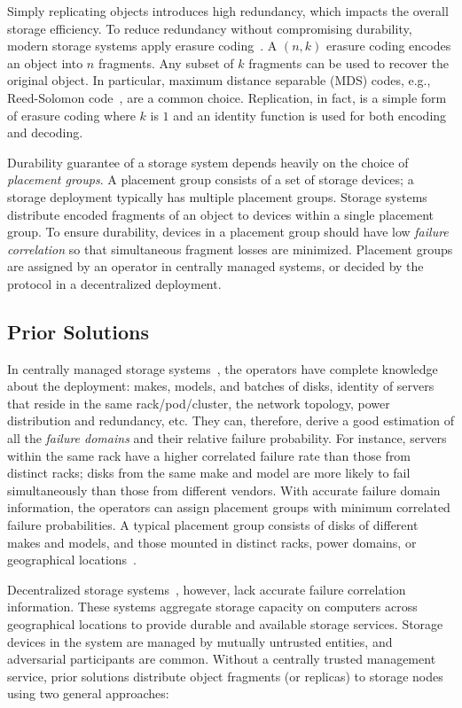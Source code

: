 Simply replicating objects introduces high redundancy, which impacts the overall storage efficiency.
To reduce redundancy without compromising durability, modern storage systems apply erasure coding~\cite{google_storage,was,hitchhiker,xor}.
A $(n, k)$ erasure coding encodes an object into $n$ fragments.
Any subset of $k$ fragments can be used to recover the original object.
In particular, maximum distance separable (MDS) codes, e.g., Reed-Solomon code~\cite{reed-solomon}, are a common choice.
Replication, in fact, is a simple form of erasure coding where $k$ is $1$ and an identity function is used for both encoding and decoding.

Durability guarantee of a storage system depends heavily on the choice of \emph{placement groups}.
A placement group consists of a set of storage devices;
a storage deployment typically has multiple placement groups.
Storage systems distribute encoded fragments of an object to devices within a single placement group.
To ensure durability, devices in a placement group should have low \emph{failure correlation} so that simultaneous fragment losses are minimized.
Placement groups are assigned by an operator in centrally managed systems, or decided by the protocol in a decentralized deployment.

\subsection{Prior Solutions}
\label{sec:background:prior}

In centrally managed storage systems~\cite{amazon_glacier,azure_storage,gfs,silica}, the operators have complete knowledge about the deployment: makes, models, and batches of disks, identity of servers that reside in the same rack/pod/cluster, the network topology, power distribution and redundancy, etc.
They can, therefore, derive a good estimation of all the \emph{failure domains} and their relative failure probability.
\ifspace
For instance, servers within the same rack have a higher correlated failure rate than those from distinct racks;
disks from the same make and model are more likely to fail simultaneously than those from different vendors.
\fi
With accurate failure domain information, the operators can assign placement groups with minimum correlated failure probabilities.
A typical placement group consists of disks of different makes and models, and those mounted in distinct racks, power domains, or geographical locations~\cite{azure_storage,tiger}.

Decentralized storage systems~\cite{xfs,farsite,oceanstore,cfs,glacier,carbonite,irisstore,ipfs}, however, lack accurate failure correlation information.
These systems aggregate storage capacity on computers across geographical locations to provide durable and available storage services.
Storage devices in the system are managed by mutually untrusted entities, and adversarial participants are common.
Without a centrally trusted management service, prior solutions distribute object fragments (or replicas) to storage nodes using two general approaches:

